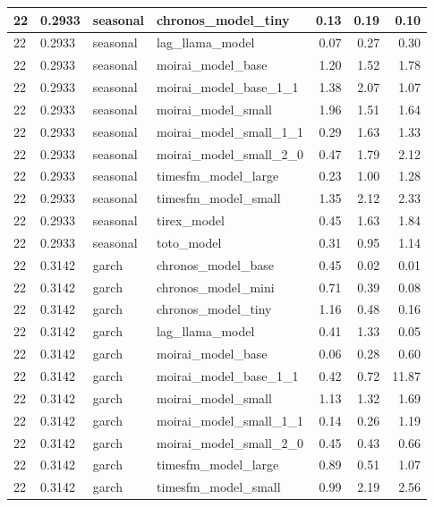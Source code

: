 {\begin{tabular}{llllrrr}
\midrule
22 & 0.2933 & seasonal & chronos\_model\_tiny & 0.13 & 0.19 & 0.10 \\
\midrule
22 & 0.2933 & seasonal & lag\_llama\_model & 0.07 & 0.27 & 0.30 \\
\midrule
22 & 0.2933 & seasonal & moirai\_model\_base & 1.20 & 1.52 & 1.78 \\
\midrule
22 & 0.2933 & seasonal & moirai\_model\_base\_1\_1 & 1.38 & 2.07 & 1.07 \\
\midrule
22 & 0.2933 & seasonal & moirai\_model\_small & 1.96 & 1.51 & 1.64 \\
\midrule
22 & 0.2933 & seasonal & moirai\_model\_small\_1\_1 & 0.29 & 1.63 & 1.33 \\
\midrule
22 & 0.2933 & seasonal & moirai\_model\_small\_2\_0 & 0.47 & 1.79 & 2.12 \\
\midrule
22 & 0.2933 & seasonal & timesfm\_model\_large & 0.23 & 1.00 & 1.28 \\
\midrule
22 & 0.2933 & seasonal & timesfm\_model\_small & 1.35 & 2.12 & 2.33 \\
\midrule
22 & 0.2933 & seasonal & tirex\_model & 0.45 & 1.63 & 1.84 \\
\midrule
22 & 0.2933 & seasonal & toto\_model & 0.31 & 0.95 & 1.14 \\
\midrule
22 & 0.3142 & garch & chronos\_model\_base & 0.45 & 0.02 & 0.01 \\
\midrule
22 & 0.3142 & garch & chronos\_model\_mini & 0.71 & 0.39 & 0.08 \\
\midrule
22 & 0.3142 & garch & chronos\_model\_tiny & 1.16 & 0.48 & 0.16 \\
\midrule
22 & 0.3142 & garch & lag\_llama\_model & 0.41 & 1.33 & 0.05 \\
\midrule
22 & 0.3142 & garch & moirai\_model\_base & 0.06 & 0.28 & 0.60 \\
\midrule
22 & 0.3142 & garch & moirai\_model\_base\_1\_1 & 0.42 & 0.72 & 11.87 \\
\midrule
22 & 0.3142 & garch & moirai\_model\_small & 1.13 & 1.32 & 1.69 \\
\midrule
22 & 0.3142 & garch & moirai\_model\_small\_1\_1 & 0.14 & 0.26 & 1.19 \\
\midrule
22 & 0.3142 & garch & moirai\_model\_small\_2\_0 & 0.45 & 0.43 & 0.66 \\
\midrule
22 & 0.3142 & garch & timesfm\_model\_large & 0.89 & 0.51 & 1.07 \\
\midrule
22 & 0.3142 & garch & timesfm\_model\_small & 0.99 & 2.19 & 2.56 \\
\midrule

\end{tabular}}
